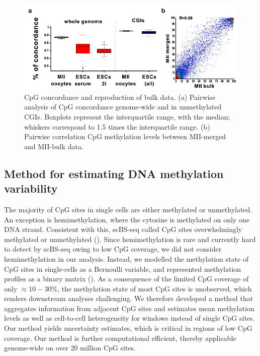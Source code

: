 \begin{figure}[htbp!]
\centering
\includegraphics[width=1.0\textwidth]{concord}
\caption[CpG concordance and reproduction of bulk data.]{CpG concordance and reproduction of bulk data. (a) Pairwise analysis of CpG concordance genome-wide and in unmethylated CGIs. Boxplots represent the interquartile range, with the median; whiskers correspond to 1.5 times the interquartile range. (b) Pairwise correlation CpG methylation levels between MII-merged and MII-bulk data.}
\label{fig:bs_concord}
\end{figure}


\subsection{Method for estimating DNA methylation variability} \label{sec:bs_method}

The majority of CpG sites in single cells are either methylated or unmethylated. An exception is hemimethylation, where the cytosine is methylated on only one DNA strand. Consistent with this, scBS-seq called CpG sites overwhelmingly methylated or unmethylated (). Since hemimethylation is rare and currently hard to detect by scBS-seq owing to low CpG coverage, we did not consider hemimethylation in our analysis. Instead, we modelled the methylation state of CpG sites in single-cells as a Bernoulli variable, and represented methylation profiles as a binary matrix (). As a consequence of the limited CpG coverage of only ${\approx}10-30\%$, the methylation state of most CpG sites is unobserved, which renders downstream analyses challenging. We therefore developed a method that aggregates information from adjacent CpG sites and estimates mean methylation levels as well as cell-to-cell heterogeneity for windows instead of single CpG sites. Our method yields uncertainty estimates, which is critical in regions of low CpG coverage. Our method is further computational efficient, thereby applicable genome-wide on over 20 million CpG sites.

